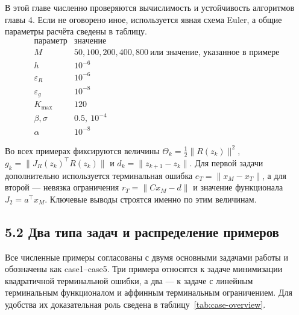 \documentclass[a4paper,12pt]{article}
\begin{document}
В этой главе численно проверяются вычислимость и устойчивость алгоритмов главы 4. Если не оговорено иное, используется явная схема Euler, а общие параметры расчёта сведены в таблицу.
\[
\begin{array}{c|c}
\text{параметр} & \text{значение}\\
\hline
M & 50,100,200,400,800\ \text{или значение, указанное в примере}\\
h & 10^{-6}\\
\varepsilon_R & 10^{-6}\\
\varepsilon_g & 10^{-8}\\
K_{\max} & 120\\
\beta,\sigma & 0.5,\ 10^{-4}\\
\alpha & 10^{-8}
\end{array}
\]

Во всех примерах фиксируются величины $\Theta_k=\frac12\|R(z_k)\|^2$, $g_k=\|J_R(z_k)^\top R(z_k)\|$ и $d_k=\|z_{k+1}-z_k\|$. Для первой задачи дополнительно используется терминальная ошибка $e_T=\|x_M-x_T\|$, а для второй --- невязка ограничения $r_T=\|Cx_M-d\|$ и значение функционала $J_2=a^\top x_M$. Ключевые выводы строятся именно по этим величинам.

\subsection{5.2 Два типа задач и распределение примеров}

Все численные примеры согласованы с двумя основными задачами работы и обозначены как case1--case5. Три примера относятся к задаче минимизации квадратичной терминальной ошибки, а два --- к задаче с линейным терминальным функционалом и аффинным терминальным ограничением. Для удобства их доказательная роль сведена в таблицу~\ref{tab:case-overview}.
\end{document}
